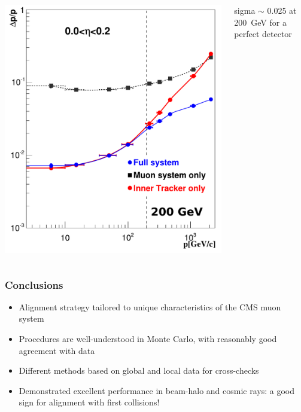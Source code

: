 \documentclass[compress]{beamer}
\begin{document}
\begin{frame}
\begin{columns}
\vspace{0.2 cm}
\includegraphics[width=\linewidth]{Figure_001-005-a.pdf}

sigma $\sim$ 0.025 at 200~GeV for a perfect detector
\end{columns}
\end{frame}


\begin{frame}
\frametitle{Conclusions}

\begin{itemize}\setlength{\itemsep}{0.5 cm}
\item Alignment strategy tailored to unique characteristics of the CMS muon system
\item Procedures are well-understood in Monte Carlo, with reasonably good agreement with data
\item Different methods based on global and local data for cross-checks
\item Demonstrated excellent performance in beam-halo and cosmic rays: a good sign for alignment with first collisions!
\end{itemize}

\end{frame}
\end{document}
